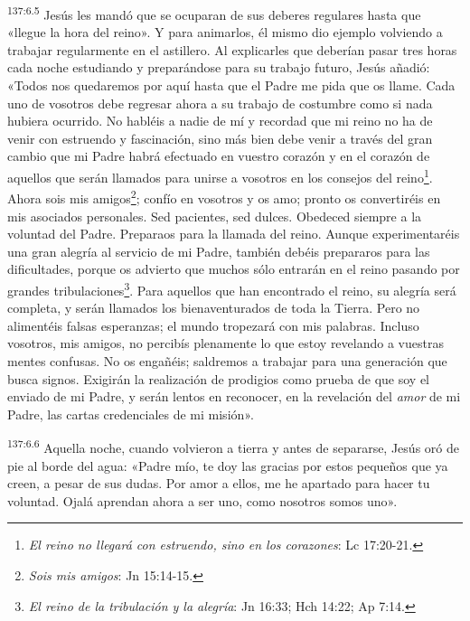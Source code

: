 \par
\textsuperscript{137:6.5} Jesús les mandó que se ocuparan de sus deberes regulares hasta que «llegue la hora del reino». Y para animarlos, él mismo dio ejemplo volviendo a trabajar regularmente en el astillero. Al explicarles que deberían pasar tres horas cada noche estudiando y preparándose para su trabajo futuro, Jesús añadió: «Todos nos quedaremos por aquí hasta que el Padre me pida que os llame. Cada uno de vosotros debe regresar ahora a su trabajo de costumbre como si nada hubiera ocurrido. No habléis a nadie de mí y recordad que mi reino no ha de venir con estruendo y fascinación, sino más bien debe venir a través del gran cambio que mi Padre habrá efectuado en vuestro corazón y en el corazón de aquellos que serán llamados para unirse a vosotros en los consejos del reino\footnote{\textit{El reino no llegará con estruendo, sino en los corazones}: Lc 17:20-21.}. Ahora sois mis amigos\footnote{\textit{Sois mis amigos}: Jn 15:14-15.}; confío en vosotros y os amo; pronto os convertiréis en mis asociados personales. Sed pacientes, sed dulces. Obedeced siempre a la voluntad del Padre. Preparaos para la llamada del reino. Aunque experimentaréis una gran alegría al servicio de mi Padre, también debéis prepararos para las dificultades, porque os advierto que muchos sólo entrarán en el reino pasando por grandes tribulaciones\footnote{\textit{El reino de la tribulación y la alegría}: Jn 16:33; Hch 14:22; Ap 7:14.}. Para aquellos que han encontrado el reino, su alegría será completa, y serán llamados los bienaventurados de toda la Tierra. Pero no alimentéis falsas esperanzas; el mundo tropezará con mis palabras. Incluso vosotros, mis amigos, no percibís plenamente lo que estoy revelando a vuestras mentes confusas. No os engañéis; saldremos a trabajar para una generación que busca signos. Exigirán la realización de prodigios como prueba de que soy el enviado de mi Padre, y serán lentos en reconocer, en la revelación del \textit{amor} de mi Padre, las cartas credenciales de mi misión».

\par
\textsuperscript{137:6.6} Aquella noche, cuando volvieron a tierra y antes de separarse, Jesús oró de pie al borde del agua: «Padre mío, te doy las gracias por estos pequeños que ya creen, a pesar de sus dudas. Por amor a ellos, me he apartado para hacer tu voluntad. Ojalá aprendan ahora a ser uno, como nosotros somos uno».

